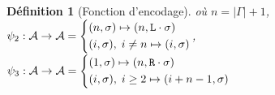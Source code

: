 \documentclass[11pt,a4paper]{article}
\newtheorem{definition}{Définition}
\newcommand*{\Left}{\textnormal{\texttt{L}}}
\newcommand*{\Right}{\textnormal{\texttt{R}}}
\newcommand*{\addresses}{\ensuremath{\mathcal{A}}}
\begin{document}
\begin{definition}[Fonction d'encodage]
    où $n = | \Gamma | + 1$, $\psi_2 : \addresses \rightarrow \addresses =
    \begin{cases*}
        (n, \sigma) \mapsto (n, \Left \cdot \sigma)\\
        (i, \sigma), \; i \neq n \mapsto (i, \sigma)
    \end{cases*}$,
    $\psi_3 : \addresses \rightarrow \addresses =
    \begin{cases*}
        (1, \sigma) \mapsto (n, \Right \cdot \sigma)\\
        (i, \sigma), \; i \geq 2 \mapsto (i + n - 1, \sigma)
    \end{cases*}$
\end{definition}
\end{document}
